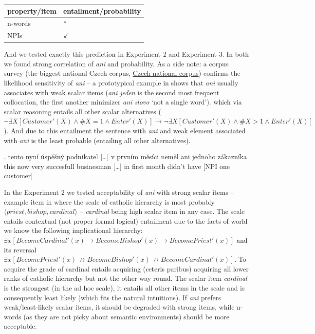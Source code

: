 \documentclass[12pt]{scrartcl}
\begin{document}
\begin{longtable}[]{@{}ll@{}}
\toprule
property/item & entailment/probability\tabularnewline
\midrule
\endhead
n-words & *\tabularnewline
NPIs & \(\checkmark\)\tabularnewline
\bottomrule
\end{longtable}


And we tested exactly this prediction in Experiment 2 and Experiment 3. In both we found strong correlation of \emph{ani} and probability. As a side note: a corpus survey (the biggest national Czech corpus,  \href{https://korpus.cz/}{Czech national corpus}) confirms the likelihood sensitivity of \textit{ani} -- a prototypical example in \Next shows that \textit{ani} usually associates with weak scalar items (\textit{ani jeden} is the second most frequent collocation, the first another minimizer \textit{ani slovo} `not a single word'). which via scalar reasoning entails all other scalar alternatives ($\neg \exists X[Customer'(X) \wedge \#X=1 \wedge Enter'(X)] \rightarrow \neg \exists X[Customer'(X) \wedge \#X>1 \wedge Enter'(X)]$). And due to this entailment the sentence with \textit{ani} and weak element associated with \textit{ani} is the least probable (entailing all other alternatives).

\ex. tento nyní úspěšný podnikatel {[}\ldots{}{]} v prvním měsíci neměl
ani jednoho zákazníka\\
this now very succesfull businesman {[}\ldots{}{]} in first month didn't
have {[}NPI one customer{]}

In the Experiment 2 we tested acceptability of \emph{ani} with strong scalar items -- example item in \Next where the scale of catholic hierarchy is most probably $\langle priest, bishop, cardinal\rangle$ -- \textit{cardinal} being high scalar item in any case. The scale entails contextual (not proper formal logical) entailment due to the facts of world we know the following implicational hierarchy: $\exists x[BecomeCardinal'(x) \rightarrow BecomeBishop'(x) \rightarrow BecomePriest'(x)]$ and its reversal $\exists x[BecomePriest'(x) \not\rightarrow BecomeBishop'(x) \not\rightarrow BecomeCardinal'(x)]$. To acquire the grade of cardinal entails acquiring (ceteris paribus) acquiring all lower ranks of catholic hierarchy but not the other way round. The scalar item \textit{cardinal} is the strongest (in the ad hoc scale), it entails all other items in the scale and is consequently least likely (which fits the natural intuitions). If \textit{ani} prefers weak/least-likely scalar items, it should be degraded with strong items, while n-words (as they are not picky about semantic environments) should be more acceptable.
\end{document}
